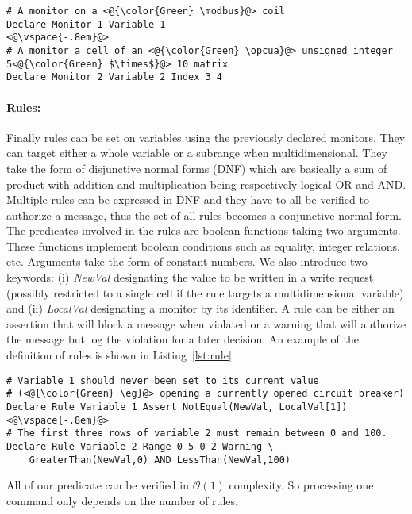 \begin{lstlisting}[label=lst:mon,caption=Monitor definition example]
# A monitor on a <@{\color{Green} \modbus}@> coil
Declare Monitor 1 Variable 1
<@\vspace{-.8em}@>
# A monitor a cell of an <@{\color{Green} \opcua}@> unsigned integer 5<@{\color{Green} $\times$}@> 10 matrix
Declare Monitor 2 Variable 2 Index 3 4
\end{lstlisting}

\paragraph{Rules:} Finally rules can be set on variables using the previously
declared monitors.
They can target either a whole variable or a subrange when multidimensional.
They take the form of disjunctive normal forms (DNF) which are basically a sum of
product with addition and multiplication being respectively logical OR and AND.
Multiple rules can be expressed in DNF and they have to all be verified to 
authorize a message, thus the set of all rules becomes a conjunctive normal
form.
The predicates involved in the rules are boolean functions taking two arguments.
These functions implement boolean conditions such as equality, integer
relations, etc.
Arguments take the form of constant numbers.
We also introduce two keywords: (i) {\em NewVal} designating the value to be
written in a write request (possibly restricted to a single cell if the rule
targets a multidimensional variable) and (ii) {\em LocalVal} designating a
monitor by its identifier.
A rule can be either an assertion that will block a message when violated or a
warning that will authorize the message but log the violation for a later
decision.
An example of the definition of rules is shown in Listing~\ref{lst:rule}.

\begin{lstlisting}[label=lst:rule,caption=Rule definition example]
# Variable 1 should never been set to its current value
# (<@{\color{Green} \eg}@> opening a currently opened circuit breaker)
Declare Rule Variable 1 Assert NotEqual(NewVal, LocalVal[1])
<@\vspace{-.8em}@>
# The first three rows of variable 2 must remain between 0 and 100.
Declare Rule Variable 2 Range 0-5 0-2 Warning \
    GreaterThan(NewVal,0) AND LessThan(NewVal,100)
\end{lstlisting}

All of our predicate can be verified in $\mathcal{O}(1)$ complexity.
So processing one command only depends on the number of rules.

